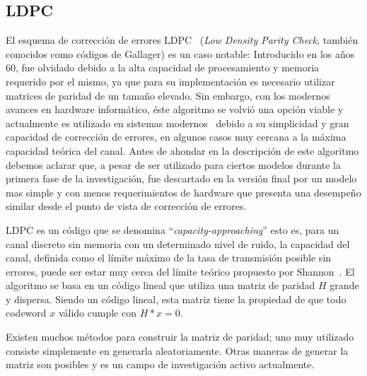 \subsection{LDPC}
El esquema de corrección de errores LDPC~\cite{gallagerpress} (\textit{Low Density Parity Check}, también conocidos como códigos de Gallager) es un caso notable: Introducido en los años 60, fue olvidado debido a la alta capacidad de procesamiento y memoria requerido por el mismo, ya que para su implementación es necesario utilizar matrices de paridad de un tamaño elevado. Sin embargo, con los modernos avances en hardware informático, éste algoritmo se volvió una opción viable y actualmente es utilizado en sistemas modernos~\cite{brack2007low} debido a su simplicidad y gran capacidad de corrección de errores, en algunos casos muy cercana a la máxima capacidad teórica del canal.
Antes de ahondar en la descripción de este algoritmo debemos aclarar que, a pesar de ser utilizado para ciertos modelos durante la primera fase de la investigación, fue descartado en la versión final por un modelo mas simple y con menos requerimientos de hardware que presenta una desempeño similar desde el punto de vista de corrección de errores.

LDPC es un código que se denomina ``\textit{capacity-approaching}'' esto es, para un canal discreto sin memoria con un determinado nivel de ruido, la capacidad del canal, definida como el límite máximo de la tasa de transmisión posible sin errores, puede ser estar muy cerca del límite teórico propuesto por Shannon~\cite{shannon48}.
El algoritmo se basa en un código lineal que utiliza una matriz de paridad $H$ grande y dispersa. Siendo un código lineal, esta matriz tiene la propiedad de que todo codeword $x$ válido cumple con $H*x=0$. 

Existen muchos métodos para construir la matriz de paridad; uno muy utilizado consiste simplemente en generarla aleatoriamente. Otras maneras de generar la matriz son posibles y es un campo de investigación activo actualmente.


